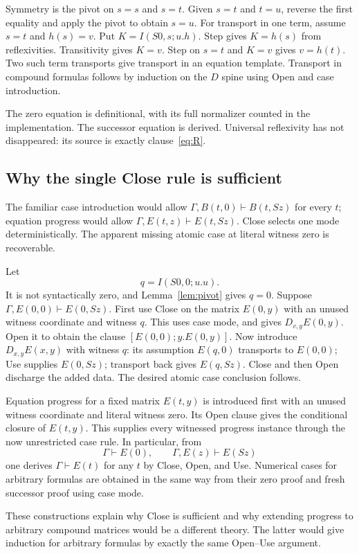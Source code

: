 \documentclass[11pt]{article}
\theoremstyle{definition}
\begin{document}
Symmetry is the pivot on $s=s$ and $s=t$. Given $s=t$ and $t=u$, reverse
the first equality and apply the pivot to obtain $s=u$.
For transport in one term, assume $s=t$ and $h(s)=v$. Put
$K=I(S0,s;u.h)$. Step gives $K=h(s)$ from reflexivities. Transitivity gives
$K=v$. Step on $s=t$ and $K=v$ gives $v=h(t)$. Two such term transports
give transport in an equation template. Transport in compound formulas
follows by induction on the $D$ spine using Open and case introduction.

The zero equation is definitional, with its full normalizer counted in the
implementation. The successor equation is derived. Universal reflexivity
has not disappeared: its source is exactly clause~\eqref{eq:R}.

\subsection{Why the single Close rule is sufficient}

The familiar case introduction would allow
$\Gamma,B(t,0)\vdash B(t,Sz)$ for every $t$; equation progress would allow
$\Gamma,E(t,z)\vdash E(t,Sz)$. Close selects one mode deterministically.
The apparent missing atomic case at literal witness zero is recoverable.

Let
\[
                       q=I(S0,0;u.u).
\]
It is not syntactically zero, and Lemma~\ref{lem:pivot} gives $q=0$.
Suppose $\Gamma,E(0,0)\vdash E(0,Sz)$. First use Close on the matrix
$E(0,y)$ with an unused witness coordinate and witness $q$. This uses
case mode, and gives $D_{v,y}E(0,y)$. Open it to obtain the clause
$[E(0,0);y.E(0,y)]$. Now introduce $D_{x,y}E(x,y)$ with witness $q$:
its assumption $E(q,0)$ transports to $E(0,0)$; Use supplies $E(0,Sz)$;
transport back gives $E(q,Sz)$. Close and then Open discharge the added
data. The desired atomic case conclusion follows.

Equation progress for a fixed matrix $E(t,y)$ is introduced first with an
unused witness coordinate and literal witness zero. Its Open clause gives
the conditional closure of $E(t,y)$. This supplies every witnessed progress
instance through the now unrestricted case rule. In particular, from
\[
 \Gamma\vdash E(0),\qquad \Gamma,E(z)\vdash E(Sz)
\]
one derives $\Gamma\vdash E(t)$ for any $t$ by Close, Open, and Use.
Numerical cases for arbitrary formulas are obtained in the same way from
their zero proof and fresh successor proof using case mode.

These constructions explain why Close is sufficient and why extending
progress to arbitrary compound matrices would be a different theory.
The latter would give induction for arbitrary formulas by exactly the
same Open--Use argument.
\end{document}
